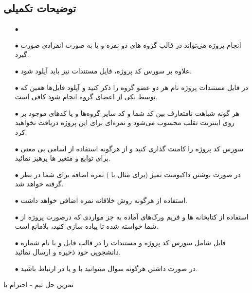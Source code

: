 \documentclass{article}
\begin{document}
	\subsection*{توضیحات تکمیلی}
	\begin{itemize}
		\item [$\bullet$] 
		
		\item [$\bullet$] انجام پروژه می‌تواند در قالب گروه های دو نفره و یا به صورت انفرادی صورت گیرد.
		
		\item [$\bullet$] علاوه بر سورس کد پروژه، فایل مستندات  نیز باید آپلود شود.
		
		\item [$\bullet$] در فایل مستندات پروژه نام هر دو عضو گروه را ذکر کنید و آپلود فایل‌ها همین که توسط یکی از اعضای گروه انجام شود کافی است.
		
		\item [$\bullet$] هر گونه شباهت نامتعارف بین کد شما و کد سایر گروه‌ها و یا کدها‌ی موجود بر روی اینترنت تقلب محسوب می‌شود و نمره‌ای برای این پروژه دریافت نخواهید کرد.
		
		\item [$\bullet$] سورس کد پروژه را کامنت گذاری کنید و از هرگونه استفاده از اسامی بی معنی برای توابع و متغیر ها پرهیز نمائيد.
		
		\item [$\bullet$] در صورت نوشتن داکیومنت تمیز (برای مثال با \lr{\LaTeX}) نمره اضافه برای شما در نظر گرفته خواهد شد.
		
		\item [$\bullet$] استفاده از هرگونه روش خلاقانه نمره اضافی خواهد داشت.
		
		\item [$\bullet$] استفاده از کتابخانه ها و فریم ورک‌های آماده به جز مواردی که درصورت پروژه از شما خواسته شده تا پیاده سازی کنید، بلامانع است.
		
		\item [$\bullet$] فایل شامل سورس کد پروژه و مستندات را در قالب فایل  و با نام شماره دانشجویی خود ذخیره و ارسال نمائید.
		
				\item [$\bullet$] در صورت داشتن هرگونه سوال میتوانید با  و یا  در ارتباط باشید.
				\newline
	\end{itemize}
	
	\begin{LTR}
		
		تمرین حل تیم - احترام با
	\end{LTR}
		

	
\end{document}
